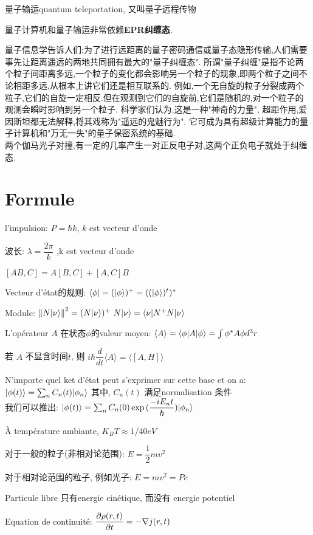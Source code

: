 \documentclass{article}
\begin{document}
量子输运quantum teleportation, 又叫量子远程传物

量子计算机和量子输运非常依赖\textbf{EPR纠缠态}.

量子信息学告诉人们:为了进行远距离的量子密码通信或量子态隐形传输,人们需要事先让距离遥远的两地共同拥有最大的"量子纠缠态".
所谓"量子纠缠"是指不论两个粒子间距离多远,一个粒子的变化都会影响另一个粒子的现象,即两个粒子之间不论相距多远,从根本上讲它们还是相互联系的.
例如,一个无自旋的粒子分裂成两个粒子,它们的自旋一定相反.但在观测到它们的自旋前,它们是随机的,对一个粒子的观测会瞬时影响到另一个粒子.
科学家们认为,这是一种"神奇的力量", 超距作用,爱因斯坦都无法解释,将其戏称为"遥远的鬼魅行为".
它可成为具有超级计算能力的量子计算机和"万无一失"的量子保密系统的基础.\\
两个伽马光子对撞,有一定的几率产生一对正反电子对,这两个正负电子就处于纠缠态.
\section{Formule}
l'impulsion: $P = \hbar k$, $k$ est vecteur d'onde

波长: $\lambda = \dfrac{2\pi}{k}$ ,k est vecteur d'onde

$[AB,C] = A[B,C] + [A,C]B$

Vecteur d'\'etat的规则: $\langle \phi| = (|\phi\rangle)^+ = ((|\phi\rangle)^t)^*$

Module: $\left\Vert N|\nu\rangle\right\Vert^2 = (N |\nu\rangle)^+ \ N |\nu\rangle = \langle\nu|N^+ N|\nu\rangle$

L'op\'erateur $A$ 在状态$\phi$的valeur moyen: $\langle A \rangle = \langle\phi|A|\phi\rangle = \int \phi^* A \phi d^3 r$

若 $A$ 不显含时间$t$, 则 $i\hbar \dfrac{d}{dt}\langle A \rangle = \langle [A,H] \rangle$

\bigskip
N'importe quel ket d'\'etat peut s'exprimer sur cette base et on a: $|\phi(t)\rangle = \sum_n C_n(t) |\phi_n\rangle$ 其中, $C_n(t)$ 满足normalisation 条件 \\
我们可以推出: $|\phi(t)\rangle = \sum_n C_n(0) \exp{(\dfrac{-i E_n t}{\hbar})} |\phi_n\rangle$
\bigskip

\`A temp\'erature ambiante, $K_B T \approx 1/40 eV$

对于一般的粒子(非相对论范围): $E = \dfrac{1}{2} mv^2$

对于相对论范围的粒子, 例如光子: $E = mv^2 = Pc$

Particule libre 只有energie cin\'etique, 而没有 energie potentiel

Equation de continuit\'e: $\dfrac{\partial \rho(r,t)}{\partial t} = - \nabla j(r,t)$
\end{document}
